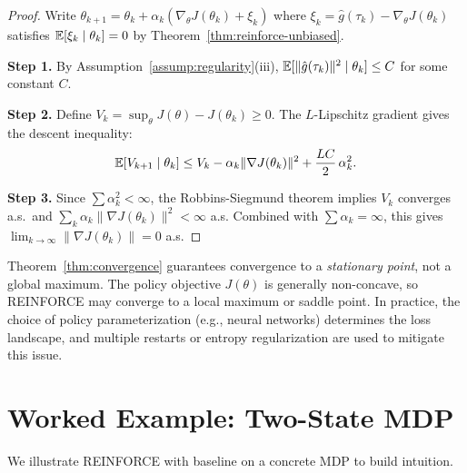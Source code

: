 \documentclass[11pt,a4paper]{article}
\begin{document}
\begin{proof}
Write $\theta_{k+1} = \theta_k + \alpha_k (\nabla_\theta J(\theta_k) + \xi_k)$
where $\xi_k = \hat{g}(\tau_k) - \nabla_\theta J(\theta_k)$ satisfies
$\mathbb{E}[\xi_k \mid \theta_k] = 0$ by Theorem~\ref{thm:reinforce-unbiased}.

\textbf{Step 1.} By Assumption~\ref{assump:regularity}(iii),
$\mathbb{E}[\|\hat{g}(\tau_k)\|^2 \mid \theta_k] \leq C$ for some constant $C$.

\textbf{Step 2.} Define $V_k = \sup_\theta J(\theta) - J(\theta_k) \geq 0$.
The $L$-Lipschitz gradient gives the descent inequality:
\[
  \mathbb{E}[V_{k+1} \mid \theta_k] \leq V_k - \alpha_k \|\nabla J(\theta_k)\|^2
  + \frac{LC}{2}\, \alpha_k^2.
\]

\textbf{Step 3.} Since $\sum \alpha_k^2 < \infty$, the Robbins-Siegmund
theorem implies $V_k$ converges a.s.\ and
$\sum_k \alpha_k \|\nabla J(\theta_k)\|^2 < \infty$ a.s. Combined with
$\sum \alpha_k = \infty$, this gives
$\lim_{k \to \infty} \|\nabla J(\theta_k)\| = 0$ a.s.
\end{proof}

\begin{warning}[title={Local Optima}]
Theorem~\ref{thm:convergence} guarantees convergence to a \emph{stationary
point}, not a global maximum. The policy objective $J(\theta)$ is
generally non-concave, so REINFORCE may converge to a local maximum or
saddle point. In practice, the choice of policy parameterization (e.g.,
neural networks) determines the loss landscape, and multiple restarts or
entropy regularization are used to mitigate this issue.
\end{warning}

\section{Worked Example: Two-State MDP}

We illustrate REINFORCE with baseline on a concrete MDP to build
intuition.
\end{document}
